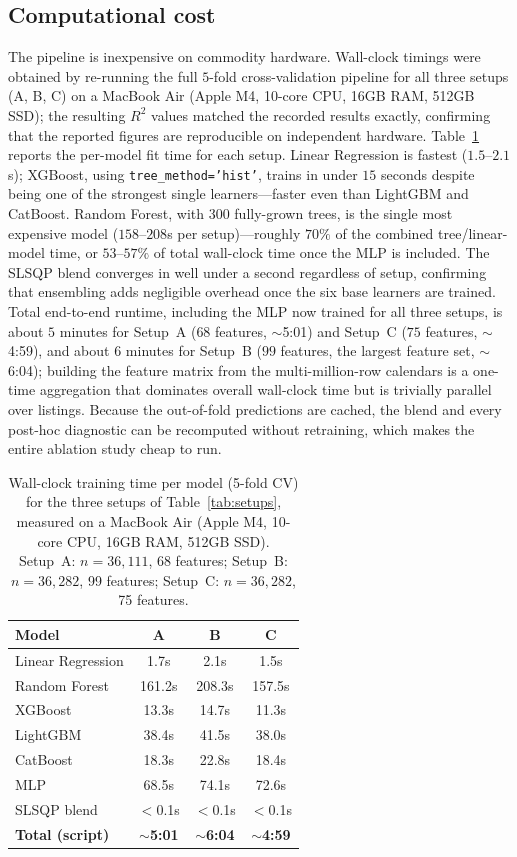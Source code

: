 \documentclass[review,12pt]{elsarticle}
\begin{document}
\subsection{Computational cost}
\label{sec:compcost}
The pipeline is inexpensive on commodity hardware. Wall-clock timings were
obtained by re-running the full $5$-fold cross-validation pipeline for all three
setups (A, B, C) on a MacBook Air (Apple M4, 10-core CPU, 16GB RAM, 512GB SSD);
the resulting $R^2$ values matched the recorded results exactly, confirming that
the reported figures are reproducible on independent hardware. Table~\ref{tab:timing}
reports the per-model fit time for each setup. Linear Regression is fastest
($1.5$--$2.1$s); XGBoost, using \texttt{tree\_method='hist'}, trains in under $15$
seconds despite being one of the strongest single learners---faster even than
LightGBM and CatBoost. Random Forest, with $300$ fully-grown trees, is the single
most expensive model ($158$--$208$s per setup)---roughly $70\%$ of the combined
tree/linear-model time, or $53$--$57\%$ of total wall-clock time once the MLP is
included. The SLSQP blend converges in well under a second regardless of setup,
confirming that ensembling adds negligible overhead once the six base learners are
trained. Total end-to-end runtime, including the MLP now trained for all three
setups, is about $5$ minutes for Setup~A ($68$ features, $\sim$5:01) and Setup~C
($75$ features, $\sim$4:59), and about $6$ minutes for Setup~B ($99$ features, the
largest feature set, $\sim$6:04); building the feature matrix from the
multi-million-row calendars is a one-time aggregation that dominates overall
wall-clock time but is trivially parallel over listings. Because the out-of-fold
predictions are cached, the blend and every post-hoc diagnostic can be recomputed
without retraining, which makes the entire ablation study cheap to run.

\begin{table}[!t]
\caption{Wall-clock training time per model (5-fold CV) for the three setups of
Table~\ref{tab:setups}, measured on a MacBook Air (Apple M4, 10-core CPU, 16GB RAM,
512GB SSD). Setup~A: $n=36{,}111$, 68 features; Setup~B: $n=36{,}282$, 99 features;
Setup~C: $n=36{,}282$, 75 features.}
\label{tab:timing}
\centering
\small
\begin{tabular}{lccc}
\toprule
Model & A & B & C \\
\midrule
Linear Regression & 1.7s & 2.1s & 1.5s \\
Random Forest & 161.2s & 208.3s & 157.5s \\
XGBoost & 13.3s & 14.7s & 11.3s \\
LightGBM & 38.4s & 41.5s & 38.0s \\
CatBoost & 18.3s & 22.8s & 18.4s \\
MLP & 68.5s & 74.1s & 72.6s \\
SLSQP blend & $<$0.1s & $<$0.1s & $<$0.1s \\
\midrule
\textbf{Total (script)} & \textbf{$\sim$5:01} & \textbf{$\sim$6:04} & \textbf{$\sim$4:59} \\
\bottomrule
\end{tabular}
\end{table}
\end{document}
